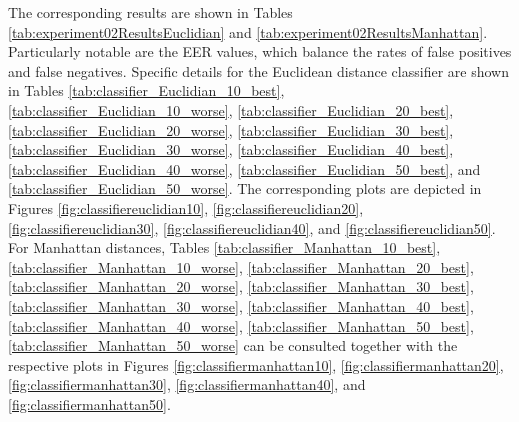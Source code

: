 		
		\par The corresponding results are shown in Tables \ref{tab:experiment02ResultsEuclidian} and \ref{tab:experiment02ResultsManhattan}. Particularly notable are the EER values, which balance the rates of false positives and false negatives. Specific details for the Euclidean distance classifier are shown in Tables \ref{tab:classifier_Euclidian_10_best}, \ref{tab:classifier_Euclidian_10_worse},
		\ref{tab:classifier_Euclidian_20_best}, \ref{tab:classifier_Euclidian_20_worse}, 
		\ref{tab:classifier_Euclidian_30_best}, \ref{tab:classifier_Euclidian_30_worse}, 
		\ref{tab:classifier_Euclidian_40_best}, \ref{tab:classifier_Euclidian_40_worse}, 
		\ref{tab:classifier_Euclidian_50_best},  and \ref{tab:classifier_Euclidian_50_worse}. The corresponding plots are depicted in Figures \ref{fig:classifiereuclidian10}, \ref{fig:classifiereuclidian20}, \ref{fig:classifiereuclidian30}, \ref{fig:classifiereuclidian40}, and \ref{fig:classifiereuclidian50}. For Manhattan distances,  Tables \ref{tab:classifier_Manhattan_10_best}, \ref{tab:classifier_Manhattan_10_worse}, 
		\ref{tab:classifier_Manhattan_20_best}, \ref{tab:classifier_Manhattan_20_worse}, 
		\ref{tab:classifier_Manhattan_30_best}, \ref{tab:classifier_Manhattan_30_worse}, 
		\ref{tab:classifier_Manhattan_40_best}, \ref{tab:classifier_Manhattan_40_worse}, 
		\ref{tab:classifier_Manhattan_50_best},
		\ref{tab:classifier_Manhattan_50_worse} 
		can be consulted together with the respective plots in Figures \ref{fig:classifiermanhattan10}, \ref{fig:classifiermanhattan20}, \ref{fig:classifiermanhattan30}, \ref{fig:classifiermanhattan40}, and \ref{fig:classifiermanhattan50}.

		
		
		
		
		
		
		
		
		
		

		\FloatBarrier

